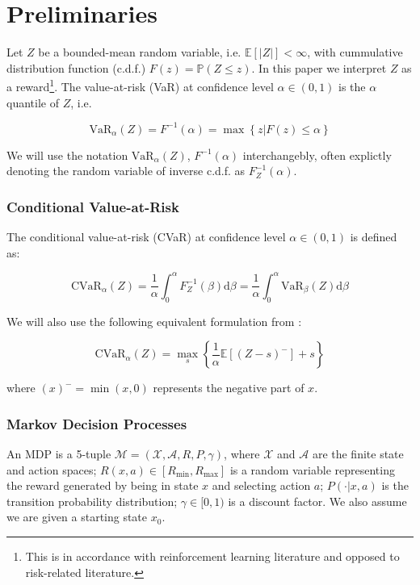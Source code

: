\chapter{Preliminaries}\label{ch:prelim}

Let $Z$ be a bounded-mean random variable, i.e. $\mathbb{E}[|Z|] < \infty$, with cummulative distribution function (c.d.f.) $F(z) = \mathbb{P}(Z \le z)$.
In this paper we interpret $Z$ as a reward\footnote{This is in accordance with reinforcement learning literature and opposed to risk-related literature.}. The value-at-risk (VaR) at confidence level $\alpha \in (0,1)$ is the $\alpha$ quantile of $Z$, i.e. 

\begin{equation}
\text{VaR}_\alpha(Z)=F^{-1}(\alpha)=\max\left\lbrace z | F(z) \le \alpha \right\rbrace
\end{equation}

We will use the notation $\text{VaR}_\alpha(Z)$, $F^{-1}(\alpha)$ interchangebly, often explictly denoting the random variable of inverse c.d.f. as $F^{-1}_Z(\alpha)$.

\subsection{Conditional Value-at-Risk}
The conditional value-at-risk (CVaR) at confidence level $\alpha \in (0,1)$ is defined as:

\begin{equation}
\text{CVaR}_\alpha(Z) = \dfrac{1}{\alpha}\int_0^\alpha F^{-1}_Z(\beta) \text{d}\beta = \dfrac{1}{\alpha}\int_0^\alpha \text{VaR}_\beta(Z) \text{d}\beta
\end{equation}

We will also use the following equivalent formulation from \cite{rockafellar2000optimization}:

\begin{equation}\label{eq:cvardef}
\text{CVaR}_\alpha(Z)=
\max_s\left\lbrace \dfrac{1}{\alpha}\mathbb{E}
\left[ (Z-s)^-\right] + s  \right\rbrace 
\end{equation}

where $(x)^- = \min(x, 0)$ represents the negative part of $x$.


\subsection{Markov Decision Processes}
An MDP is a 5-tuple $\mathcal{M} = (\mathcal{X}, \mathcal{A}, R, P, \gamma)$, where $\mathcal{X}$ and $\mathcal{A}$ are the finite state and action spaces; $R(x, a) \in [R_{\min}, R_{\max}]$ is a random variable representing the reward generated by being in state $x$ and selecting action $a$; $P(\cdot|x, a)$ is the transition probability distribution; $\gamma \in [0, 1)$ is a discount factor. We also assume we are given a starting state $x_0$.


